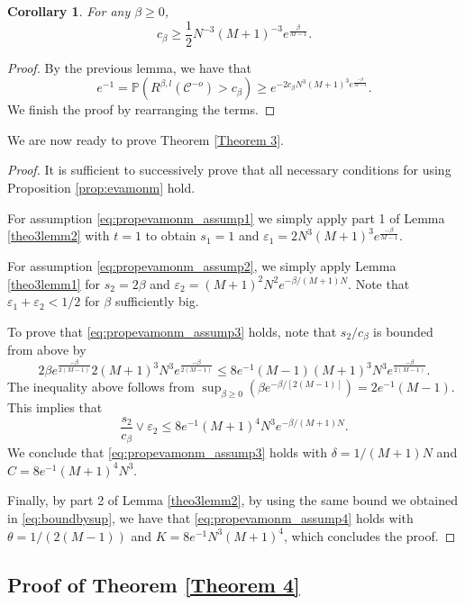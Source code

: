 \documentclass[11pt]{article}
\newtheorem{corollary}[theorem]{Corollary}
\theoremstyle{definition}
\begin{document}
\begin{corollary}\label{theo3coro2}
    For any $\beta \geq 0$, 
    $$
       c_\beta \geq \frac{1}{2}N^{-3}(M+1)^{-3}e^{\frac{\beta}{M-1}}.
    $$
\end{corollary}

\begin{proof}
By the previous lemma,  we have that
$$
e^{-1}= \mathbb{P}(R^{\beta,l}(\mathcal{C}^{-o})>c_{\beta}) \geq e^{-2c_{\beta}N^3(M+1)^3e^{\frac{-\beta}{M-1}}}.
$$
We finish the proof by rearranging the terms.
\end{proof}

We are now ready to prove Theorem \ref{Theorem 3}.

\begin{proof}
It is sufficient to successively prove that all necessary conditions for using Proposition \ref{prop:evamonm} hold. 

For assumption \eqref{eq:propevamonm_assump1} we simply apply part 1 of Lemma \ref{theo3lemm2} with $t=1$ to obtain  $s_1=1$ and $\varepsilon_1=2N^3(M+1)^3e^{\frac{-\beta}{M-1}}$.

For assumption \eqref{eq:propevamonm_assump2}, we simply apply Lemma \ref{theo3lemm1} for $s_2=2\beta$ and $\varepsilon_2=(M+1)^2N^2e^{-\beta /(M+1)N}$. Note that $\varepsilon_1+\varepsilon_2<1/2$ for $\beta$ sufficiently big.

To prove that \eqref{eq:propevamonm_assump3} holds, note that $s_2/c_{\beta}$ is bounded from above by
\begin{equation} \label{eq:boundbysup}
2\beta e^\frac{-\beta}{2(M-1)}2(M+1)^3N^3e^\frac{-\beta}{2(M-1)} \leq 8e^{-1}(M-1)(M+1)^3N^3e^\frac{-\beta}{2(M-1)}.
\end{equation}
The inequality above follows from $\sup_{\beta\geq 0}(\beta e^{-\beta /[2(M-1)]})=2e^{-1}(M-1)$. This implies that
$$
\frac{s_2}{c_{\beta}}\vee \varepsilon_2 \leq 8e^{-1}(M+1)^4N^3e^{-\beta/(M+1)N}.
$$
We conclude that \eqref{eq:propevamonm_assump3} holds with $\delta=1/(M+1)N$ and $C=8e^{-1}(M+1)^4N^3$. 

Finally, by part 2 of Lemma \ref{theo3lemm2}, by using the same bound we obtained in \eqref{eq:boundbysup}, we have that \eqref{eq:propevamonm_assump4} holds with $\theta=1/(2(M-1))$ and $K=8e^{-1}N^3(M+1)^4$, which concludes the proof. 
\end{proof}

\subsection{Proof of Theorem \ref{Theorem 4}} \label{subsec:T4}
\end{document}
